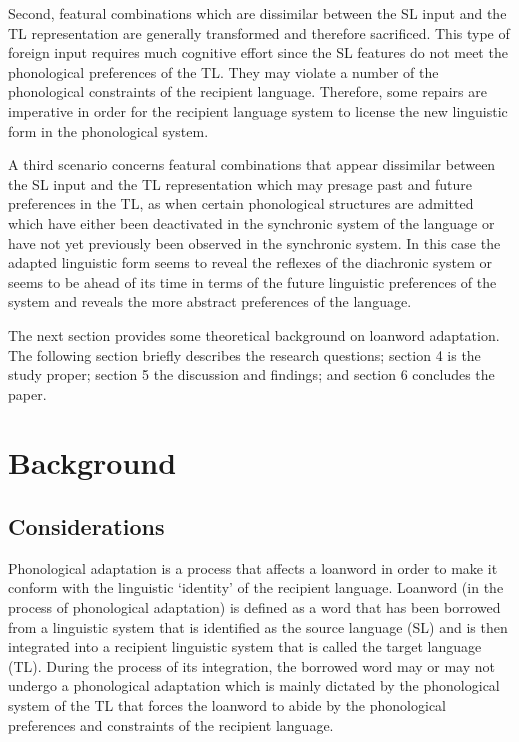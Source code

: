 \documentclass[output=paper]{langscibook}
\begin{document}
Second, featural combinations which are dissimilar between the SL input and the TL representation are generally transformed and therefore sacrificed. This type of foreign input requires much cognitive effort since the SL features do not meet the phonological preferences of the TL. They may violate a number of the phonological constraints of the recipient language. Therefore, some repairs are imperative in order for the recipient language system to license the new linguistic form in the phonological system.

A third scenario concerns featural combinations that appear dissimilar between the SL input and the TL representation which may presage past and future preferences in the TL, as when certain phonological structures are admitted which have either been deactivated in the synchronic system of the language or have not yet previously been observed in the synchronic system. In this case the adapted linguistic form seems to reveal the reflexes of the diachronic system or seems to be ahead of its time in terms of the future linguistic preferences of the system and reveals the more abstract preferences of the language.

The next section provides some theoretical background on loanword adaptation. The following section briefly describes the research questions; section 4 is the study proper; section 5 the discussion and findings; and section 6 concludes the paper.

\section{Background}
\subsection{Considerations}
Phonological adaptation is a process that affects a loanword in order to make it conform with the linguistic ‘identity’ of the recipient language. Loanword (in the process of phonological adaptation) is defined as a word that has been borrowed from a linguistic system that is identified as the source language (SL) and is then integrated into a recipient linguistic system that is called the target language (TL). During the process of its integration, the borrowed word may or may not undergo a phonological adaptation which is mainly dictated by the phonological system of the TL that forces the loanword to abide by the phonological preferences and constraints of the recipient language.
\end{document}
